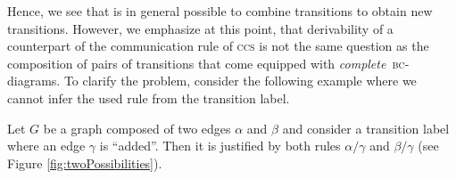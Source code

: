 Hence, 
we see that is in general possible to combine  transitions to obtain new transitions. 
However, 
we emphasize at this point, 
that derivability of a counterpart of the communication rule of \textsc{ccs}
is not the same question as the composition 
of pairs of transitions that come equipped with \emph{complete}~\textsc{bc}-diagrams. 
To clarify the problem, 
consider the following example where we cannot  infer the used rule from the 
transition label. 


\begin{example}
  Let $G$ be a graph composed of two edges $\alpha$ and $\beta$ and consider a transition label where an edge $\gamma$ is ``added''. 
  Then it is justified by both rules $\alpha/\gamma$ and $\beta/\gamma$ (see Figure \ref{fig:twoPossibilities}). 
\end{example}

